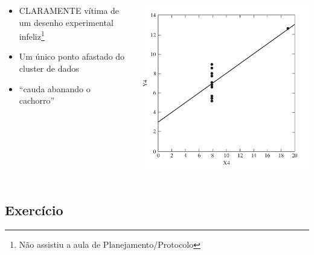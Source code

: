 \documentclass{beamer}
\begin{document}
\begin{frame}
  \begin{columns}
    \begin{column}{.5\textwidth}
      \begin{itemize}
        \tiny
      \item<2> CLARAMENTE vítima de um desenho experimental infeliz\footnote[frame]{\tiny Não assistiu a aula de Planejamento/Protocolo}
      \item<3,4> Um único ponto afastado do cluster de dados
      \item<4> ``cauda abanando o cachorro''
      \end{itemize}
    \end{column}
    \begin{column}{.5\textwidth}
      \begin{center}
        \includegraphics[width=\textwidth]{EDA/eda-dispersao4}
      \end{center}
    \end{column}
  \end{columns}
\end{frame}

\subsection{Exercício}
\end{document}
